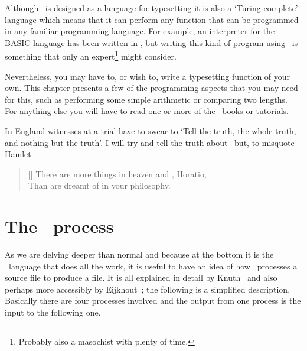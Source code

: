     Although \tx\ is designed as a language for typesetting it is
also a `Turing complete' 
language
which means that it can perform any function that can be programmed in
any familiar programming language. For example, an interpreter for the
BASIC language has been written in \tx, but writing this kind of program
using \tx\ is something that only an expert\footnote{Probably also a masochist
with plenty of time.} might consider.

    Nevertheless, you may have to, or wish to, write a typesetting function
of your own. This chapter presents a few of the programming aspects that
you may need for this, such as performing some simple arithmetic or comparing
two lengths. For anything else you will have to read one or more of the 
\tx\ books or tutorials.



    In England witnesses at a trial have to swear to `Tell the truth, the
whole truth, and nothing but the truth'. I will try and tell the truth
about \tx\ but, to misquote Hamlet 
\settowidth{\versewidth}{There are more things in heaven and TeX, Horatio}
\begin{verse}[\versewidth]
There are more things in heaven and \tx, Horatio, \\
Than are dreamt of in your philosophy.
\end{verse}

\section{The \tx\ process}

    As we are delving deeper than normal and because at the bottom
it is the \tx\ language that does all the work,  it is useful to 
have an idea of how \tx\ processes a source file to produce a 
 file. It is all explained in detail by 
Knuth~\cite{TEXBOOK} and also perhaps more accessibly by 
Eijkhout~\cite{TEXBYTOPIC}; 
the following is a simplified description.
Basically there are four processes involved and the output from one 
process is the input to the following one.

